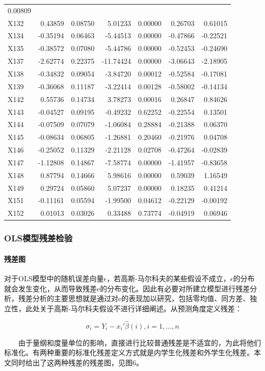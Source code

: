 \documentclass[
]{article}
\begin{document}
\begin{longtable}[]{@{}lrrrrrr@{}}
0.00809\tabularnewline
X132 & 0.43859 & 0.08750 & 5.01233 & 0.00000 & 0.26703 &
0.61015\tabularnewline
X134 & -0.35194 & 0.06463 & -5.44513 & 0.00000 & -0.47866 &
-0.22521\tabularnewline
X135 & -0.38572 & 0.07080 & -5.44786 & 0.00000 & -0.52453 &
-0.24690\tabularnewline
X137 & -2.62774 & 0.22375 & -11.74424 & 0.00000 & -3.06643 &
-2.18905\tabularnewline
X138 & -0.34832 & 0.09054 & -3.84720 & 0.00012 & -0.52584 &
-0.17081\tabularnewline
X139 & -0.36068 & 0.11187 & -3.22414 & 0.00128 & -0.58002 &
-0.14134\tabularnewline
X142 & 0.55736 & 0.14734 & 3.78273 & 0.00016 & 0.26847 &
0.84626\tabularnewline
X143 & -0.04527 & 0.09195 & -0.49232 & 0.62252 & -0.22554 &
0.13501\tabularnewline
X144 & -0.07509 & 0.07079 & -1.06084 & 0.28884 & -0.21388 &
0.06370\tabularnewline
X145 & -0.08634 & 0.06805 & -1.26881 & 0.20460 & -0.21976 &
0.04708\tabularnewline
X146 & -0.25052 & 0.11329 & -2.21128 & 0.02708 & -0.47264 &
-0.02839\tabularnewline
X147 & -1.12808 & 0.14867 & -7.58774 & 0.00000 & -1.41957 &
-0.83658\tabularnewline
X148 & 0.87794 & 0.14666 & 5.98616 & 0.00000 & 0.59039 &
1.16549\tabularnewline
X149 & 0.29724 & 0.05860 & 5.07237 & 0.00000 & 0.18235 &
0.41214\tabularnewline
X151 & -0.11161 & 0.05594 & -1.99500 & 0.04612 & -0.22129 &
-0.00192\tabularnewline
X152 & 0.01013 & 0.03026 & 0.33488 & 0.73774 & -0.04919 &
0.06946\tabularnewline
\bottomrule
\end{longtable}

\hypertarget{olsux6a21ux578bux6b8bux5deeux68c0ux9a8c}{%
\subsubsection{OLS模型残差检验}\label{olsux6a21ux578bux6b8bux5deeux68c0ux9a8c}}

\hypertarget{ux6b8bux5deeux56fe}{%
\paragraph{残差图}\label{ux6b8bux5deeux56fe}}

对于OLS模型中的随机误差向量\(\epsilon\)，若高斯-马尔科夫的某些假设不成立，\(\epsilon\)的分布就会发生变化，从而导致残差e的分布变化。因此有必要对所建立模型进行残差分析，残差分析的主要思想就是通过对e的表现加以研究，包括零均值、同方差、独立性，此处关于高斯-马尔科夫假设不进行详细阐述。从预测角度定义残差：

\[\sigma_i=Y_i-x_i'\hat{\beta}(i), i=1,...,n\]

  由于量纲和度量单位的影响，直接进行比较普通残差是不适宜的，为此将他们标准化。有两种重要的标准化残差定义方式就是内学生化残差和外学生化残差。本文同时给出了这两种残差的残差图，见图6。
\end{document}
